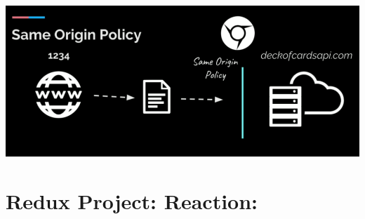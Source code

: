 \documentclass[8pt,a4paper]{extarticle}
\begin{document}
\begin{itemize}
\includegraphics[scale=0.22]{cors.png}



 
\end{itemize}

\section*{Redux Project: Reaction:}
\end{document}
